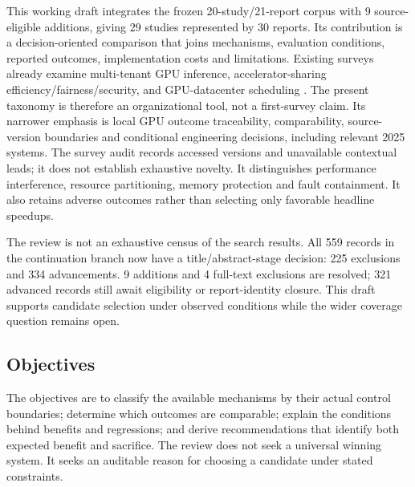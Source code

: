 This working draft integrates the frozen 20-study/21-report corpus with 9 source-eligible additions, giving 29 studies represented by 30 reports. Its contribution is a decision-oriented comparison that joins mechanisms, evaluation conditions, reported outcomes, implementation costs and limitations. Existing surveys already examine multi-tenant GPU inference, accelerator-sharing efficiency/fairness/security, and GPU-datacenter scheduling \cite{surveyYu,surveyHuang,surveyYe}. The present taxonomy is therefore an organizational tool, not a first-survey claim. Its narrower emphasis is local GPU outcome traceability, comparability, source-version boundaries and conditional engineering decisions, including relevant 2025 systems. The survey audit records accessed versions and unavailable contextual leads; it does not establish exhaustive novelty. It distinguishes performance interference, resource partitioning, memory protection and fault containment. It also retains adverse outcomes rather than selecting only favorable headline speedups.

The review is not an exhaustive census of the search results. All 559 records in the continuation branch now have a title/abstract-stage decision: 225 exclusions and 334 advancements. 9 additions and 4 full-text exclusions are resolved; 321 advanced records still await eligibility or report-identity closure. This draft supports candidate selection under observed conditions while the wider coverage question remains open.

\subsection{Objectives}
The objectives are to classify the available mechanisms by their actual control boundaries; determine which outcomes are comparable; explain the conditions behind benefits and regressions; and derive recommendations that identify both expected benefit and sacrifice. The review does not seek a universal winning system. It seeks an auditable reason for choosing a candidate under stated constraints.

